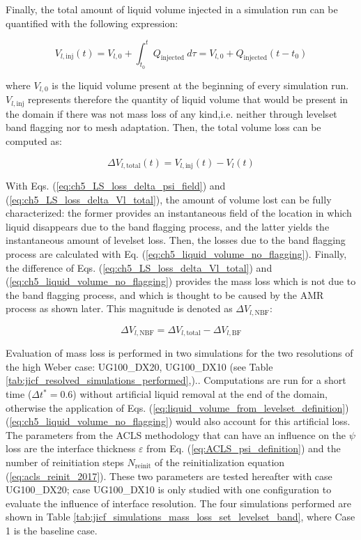 Finally, the total amount of liquid volume injected in a simulation run can be quantified with the following expression:


\begin{equation}
\label{eq:ch5_liquid_volume_injected}
V_{l,\mathrm{inj}} \left( t \right) = V_{l,0} + \int_{t_0}^t Q_\mathrm{injected}~d\tau = V_{l,0} + Q_\mathrm{injected}  \left( t - t_0 \right)
\end{equation}

where $V_{l,0}$ is the liquid volume present at the beginning of every simulation run. $V_{l,\mathrm{inj}}$ represents therefore the quantity of liquid volume that would be present in the domain if there was not mass loss of any kind,i.e. neither through levelset band flagging nor to mesh adaptation. Then, the total volume loss can be computed as:

\begin{equation}
\label{eq:ch5_LS_loss_delta_Vl_total}
\Delta V_{l,\mathrm{total}}  \left( t \right)  = V_{l,\mathrm{inj}} \left( t \right) - V_l \left( t \right)
\end{equation}

With Eqs. (\ref{eq:ch5_LS_loss_delta_psi_field}) and (\ref{eq:ch5_LS_loss_delta_Vl_total}), the amount of volume lost can be fully characterized: the former provides an instantaneous field of the location in which liquid disappears due to the band flagging process, and the latter yields the instantaneous amount of levelset loss. Then, the losses due to the band flagging process are calculated with Eq. (\ref{eq:ch5_liquid_volume_no_flagging}). Finally, the difference of Eqs. (\ref{eq:ch5_LS_loss_delta_Vl_total}) and (\ref{eq:ch5_liquid_volume_no_flagging}) provides the mass loss which is not due to the band flagging process, and which is thought to be caused by the AMR process as shown later. This magnitude is denoted as $\Delta V_{l,\mathrm{NBF}}$: 

\begin{equation}
\Delta V_{l,\mathrm{NBF}} = \Delta V_{l,\mathrm{total}} - \Delta V_{l,\mathrm{BF}}
\end{equation}

Evaluation of mass loss is performed in two simulations for the two resolutions of the high Weber case: UG100\_DX20, UG100\_DX10 (see Table \ref{tab:jicf_resolved_simulations_performed},).. Computations are run for a short time ($\Delta t^* = 0.6$) without artificial liquid removal at the end of the domain, otherwise the application of Eqs. (\ref{eq:liquid_volume_from_levelset_definition}) (\ref{eq:ch5_liquid_volume_no_flagging}) would also account for this artificial loss. The parameters from the ACLS methodology that can have an influence on the $\psi$ loss are the interface thickness $\varepsilon$ from Eq. (\ref{eq:ACLS_psi_definition}) and the number of reinitiation steps $N_\mathrm{reinit}$ of the reinitialization equation (\ref{eq:acls_reinit_2017}). These two parameters are tested hereafter with case UG100\_DX20; case UG100\_DX10 is only studied with one configuration to evaluate the influence of interface resolution. The four simulations performed are shown in Table \ref{tab:jicf_simulations_mass_loss_set_levelset_band}, where Case 1 is the baseline case. 

